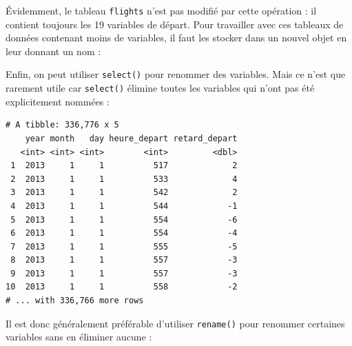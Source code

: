 \documentclass[a4paperpaper,]{article}
\newenvironment{Shaded}{\begin{snugshade}}{\end{snugshade}}
\newcommand{\KeywordTok}[1]{\textcolor[rgb]{0.13,0.29,0.53}{\textbf{#1}}}
\newcommand{\DataTypeTok}[1]{\textcolor[rgb]{0.13,0.29,0.53}{#1}}
\newcommand{\StringTok}[1]{\textcolor[rgb]{0.31,0.60,0.02}{#1}}
\newcommand{\OperatorTok}[1]{\textcolor[rgb]{0.81,0.36,0.00}{\textbf{#1}}}
\newcommand{\NormalTok}[1]{#1}
\theoremstyle{definition}
\theoremstyle{definition}
\theoremstyle{definition}
\theoremstyle{remark}
\begin{document}
Évidemment, le tableau \texttt{flights} n'est pas modifié par cette
opération : il contient toujours les 19 variables de départ. Pour
travailler avec ces tableaux de données contenant moins de variables, il
faut les stocker dans un nouvel objet en leur donnant un nom :

\begin{Shaded}
\end{Shaded}

Enfin, on peut utiliser \texttt{select()} pour renommer des variables.
Mais ce n'est que rarement utile car \texttt{select()} élimine toutes
les variables qui n'ont pas été explicitement nommées :

\begin{Shaded}
\end{Shaded}

\begin{verbatim}
# A tibble: 336,776 x 5
    year month   day heure_depart retard_depart
   <int> <int> <int>        <int>         <dbl>
 1  2013     1     1          517             2
 2  2013     1     1          533             4
 3  2013     1     1          542             2
 4  2013     1     1          544            -1
 5  2013     1     1          554            -6
 6  2013     1     1          554            -4
 7  2013     1     1          555            -5
 8  2013     1     1          557            -3
 9  2013     1     1          557            -3
10  2013     1     1          558            -2
# ... with 336,766 more rows
\end{verbatim}

Il est donc généralement préférable d'utiliser \texttt{rename()} pour
renommer certaines variables sans en éliminer aucune :

\begin{Shaded}
\end{Shaded}
\end{document}
